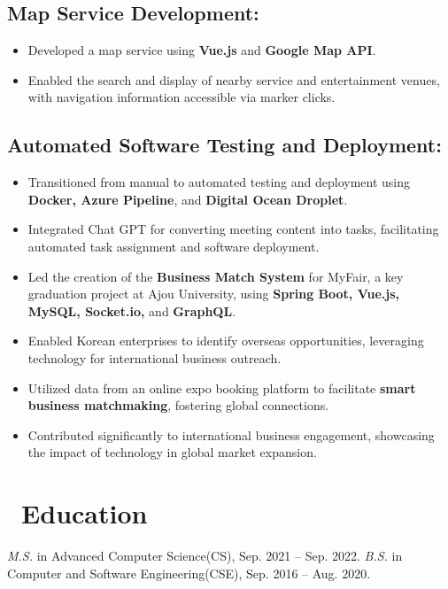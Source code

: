\documentclass{resume}
\begin{document}
{\small\subsection*{Map Service Development:}}
\begin{itemize}[noitemsep]
    \item Developed a map service using \textbf{Vue.js} and \textbf{Google Map API}.
    \item Enabled the search and display of nearby service and entertainment venues, with navigation information accessible via marker clicks.
\end{itemize}
{\small\subsection*{Automated Software Testing and Deployment:}}
\begin{itemize}[noitemsep]
    \item Transitioned from manual to automated testing and deployment using \textbf{Docker, Azure Pipeline}, and \textbf{Digital Ocean Droplet}.
    \item Integrated Chat GPT for converting meeting content into tasks, facilitating automated task assignment and software deployment.
\end{itemize}


\begin{itemize}
  \item Led the creation of the \textbf{Business Match System} for MyFair, a key graduation project at Ajou University, using \textbf{Spring Boot, Vue.js, MySQL, Socket.io,} and \textbf{GraphQL}.
  \item Enabled Korean enterprises to identify overseas opportunities, leveraging technology for international business outreach.
  \item Utilized data from an online expo booking platform to facilitate \textbf{smart business matchmaking}, fostering global connections.
  \item Contributed significantly to international business engagement, showcasing the impact of technology in global market expansion.
\end{itemize}


\section{\faGraduationCap\ Education}
\textit{M.S.} in Advanced Computer Science(CS), Sep. 2021 -- Sep. 2022.
\textit{B.S.} in Computer and Software Engineering(CSE), Sep. 2016 -- Aug. 2020.
\end{document}
